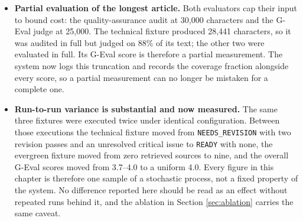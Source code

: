 \begin{itemize}
    \item \textbf{Partial evaluation of the longest article.} Both evaluators
      cap their input to bound cost: the quality-assurance audit at 30,000
      characters and the G-Eval judge at 25,000. The technical fixture produced
      28,441 characters, so it was audited in full but judged on 88\% of its
      text; the other two were evaluated in full. Its G-Eval score is therefore
      a partial measurement. The system now logs this truncation and records the
      coverage fraction alongside every score, so a partial measurement can no
      longer be mistaken for a complete one.

    \item \textbf{Run-to-run variance is substantial and now measured.} The same
      three fixtures were executed twice under identical configuration. Between
      those executions the technical fixture moved from
      \texttt{NEEDS\_REVISION} with two revision passes and an unresolved
      critical issue to \texttt{READY} with none, the evergreen fixture moved
      from zero retrieved sources to nine, and the overall G-Eval scores moved
      from 3.7--4.0 to a uniform 4.0. Every figure in this chapter is therefore
      one sample of a stochastic process, not a fixed property of the system. No
      difference reported here should be read as an effect without repeated
      runs behind it, and the ablation in Section \ref{sec:ablation} carries the
      same caveat.
\end{itemize}